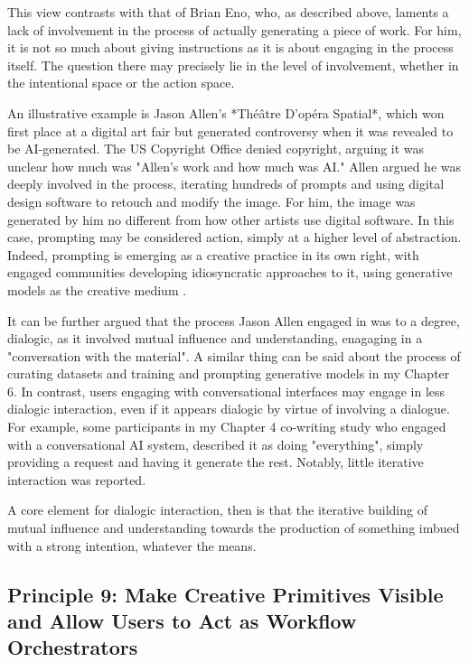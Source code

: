 This view contrasts with that of Brian Eno, who, as described above, laments a lack of involvement in the process of actually generating a piece of work. For him, it is not so much about giving instructions as it is about engaging in the process itself. The question there may precisely lie in the level of involvement, whether in the intentional space or the action space.

An illustrative example is Jason Allen's *Théâtre D'opéra Spatial*, which won first place at a digital art fair but generated controversy when it was revealed to be AI-generated. The US Copyright Office denied copyright, arguing it was unclear how much was "Allen's work and how much was AI." Allen argued he was deeply involved in the process, iterating hundreds of prompts and using digital design software to retouch and modify the image. For him, the image was generated by him no different from how other artists use digital software. In this case, prompting may be considered action, simply at a higher level of abstraction.  Indeed, prompting is emerging as a creative practice in its own right, with engaged communities developing idiosyncratic approaches to it, using generative models as the creative medium \cite{Chang2023-tv, Smith2022-dm}.

It can be further argued that the process Jason Allen engaged in was to a degree, dialogic, as it involved mutual influence and understanding, enagaging in a "conversation with the material". A similar thing can be said about the process of curating datasets and training and prompting generative models in my Chapter 6. In contrast, users engaging with conversational interfaces may engage in less dialogic interaction, even if it appears dialogic by virtue of involving a dialogue. For example, some participants in my Chapter 4 co-writing study who engaged with a conversational AI system, described it as doing "everything", simply providing a request and having it generate the rest. Notably, little iterative interaction was reported. 

A core element for dialogic interaction, then is that the iterative building of mutual influence and understanding towards the production of something imbued with a strong intention, whatever the means. 


\subsection{Principle 9: Make Creative Primitives Visible and Allow Users to Act as Workflow Orchestrators}

